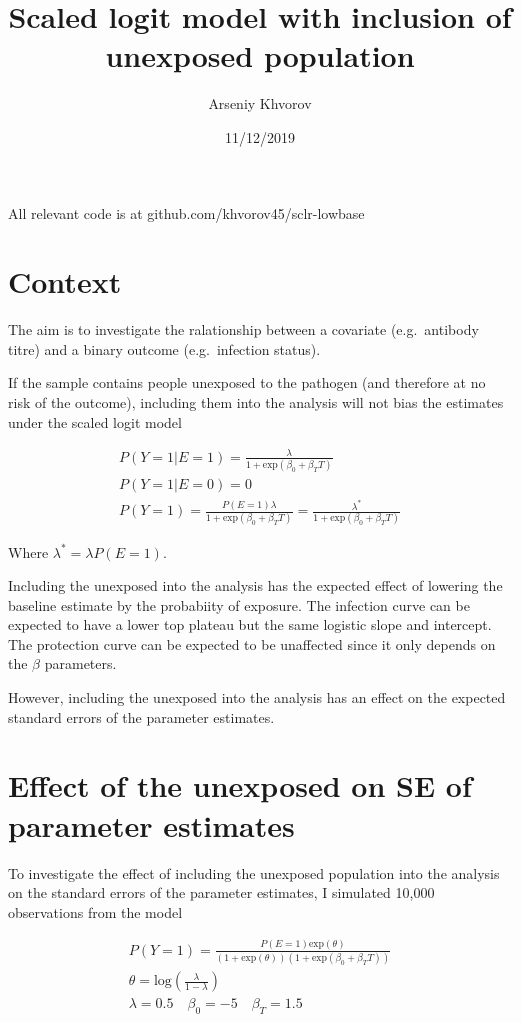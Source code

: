 \documentclass[]{article}
\title{Scaled logit model with inclusion of unexposed population}
\author{Arseniy Khvorov}
\date{11/12/2019}
\begin{document}
\maketitle

All relevant code is at github.com/khvorov45/sclr-lowbase

\hypertarget{context}{%
\section{Context}\label{context}}

The aim is to investigate the ralationship between a covariate (e.g.~antibody titre) and a binary outcome (e.g.~infection status).

If the sample contains people unexposed to the pathogen (and therefore at no risk of the outcome), including them into the analysis will not bias the estimates under the scaled logit model

\[
\begin{gathered}
P(Y=1|E=1) = \frac{\lambda}{1+\text{exp}(\beta_0+\beta_T T)} \\
P(Y=1|E=0) = 0 \\
P(Y=1) = \frac{P(E=1)\lambda}{1+\text{exp}(\beta_0+\beta_T T)} = \frac{\lambda^*}{1+\text{exp}(\beta_0+\beta_T T)}
\end{gathered}
\]

Where \(\lambda^* = \lambda P(E=1)\).

Including the unexposed into the analysis has the expected effect of lowering the baseline estimate by the probabiity of exposure. The infection curve can be expected to have a lower top plateau but the same logistic slope and intercept. The protection curve can be expected to be unaffected since it only depends on the \(\beta\) parameters.

However, including the unexposed into the analysis has an effect on the expected standard errors of the parameter estimates.

\hypertarget{se}{%
\section{Effect of the unexposed on SE of parameter estimates}\label{se}}

To investigate the effect of including the unexposed population into the analysis on the standard errors of the parameter estimates, I simulated 10,000 observations from the model

\[
\begin{gathered}
P(Y=1) = \frac{P(E=1)\text{exp}(\theta)}{(1+\text{exp}(\theta))(1+\text{exp}(\beta_0+\beta_T T))} \\
\theta = \text{log}(\frac{\lambda}{1-\lambda}) \\
\lambda = 0.5 \quad \beta_0 = -5 \quad \beta_T = 1.5
\end{gathered}
\]
\end{document}
